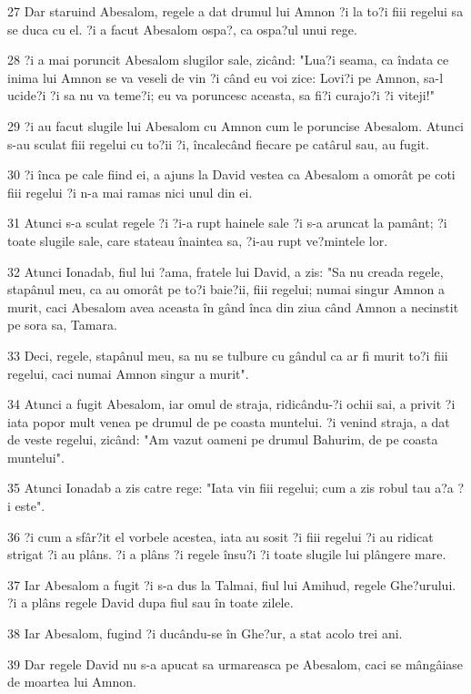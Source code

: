 \par 27 Dar staruind Abesalom, regele a dat drumul lui Amnon ?i la to?i fiii regelui sa se duca cu el. ?i a facut Abesalom ospa?, ca ospa?ul unui rege.
\par 28 ?i a mai poruncit Abesalom slugilor sale, zicând: "Lua?i seama, ca îndata ce inima lui Amnon se va veseli de vin ?i când eu voi zice: Lovi?i pe Amnon, sa-l ucide?i ?i sa nu va teme?i; eu va poruncesc aceasta, sa fi?i curajo?i ?i viteji!"
\par 29 ?i au facut slugile lui Abesalom cu Amnon cum le poruncise Abesalom. Atunci s-au sculat fiii regelui cu to?ii ?i, încalecând fiecare pe catârul sau, au fugit.
\par 30 ?i înca pe cale fiind ei, a ajuns la David vestea ca Abesalom a omorât pe coti fiii regelui ?i n-a mai ramas nici unul din ei.
\par 31 Atunci s-a sculat regele ?i ?i-a rupt hainele sale ?i s-a aruncat la pamânt; ?i toate slugile sale, care stateau înaintea sa, ?i-au rupt ve?mintele lor.
\par 32 Atunci Ionadab, fiul lui ?ama, fratele lui David, a zis: "Sa nu creada regele, stapânul meu, ca au omorât pe to?i baie?ii, fiii regelui; numai singur Amnon a murit, caci Abesalom avea aceasta în gând înca din ziua când Amnon a necinstit pe sora sa, Tamara.
\par 33 Deci, regele, stapânul meu, sa nu se tulbure cu gândul ca ar fi murit to?i fiii regelui, caci numai Amnon singur a murit".
\par 34 Atunci a fugit Abesalom, iar omul de straja, ridicându-?i ochii sai, a privit ?i iata popor mult venea pe drumul de pe coasta muntelui. ?i venind straja, a dat de veste regelui, zicând: "Am vazut oameni pe drumul Bahurim, de pe coasta muntelui".
\par 35 Atunci Ionadab a zis catre rege: "Iata vin fiii regelui; cum a zis robul tau a?a ?i este".
\par 36 ?i cum a sfâr?it el vorbele acestea, iata au sosit ?i fiii regelui ?i au ridicat strigat ?i au plâns. ?i a plâns ?i regele însu?i ?i toate slugile lui plângere mare.
\par 37 Iar Abesalom a fugit ?i s-a dus la Talmai, fiul lui Amihud, regele Ghe?urului. ?i a plâns regele David dupa fiul sau în toate zilele.
\par 38 Iar Abesalom, fugind ?i ducându-se în Ghe?ur, a stat acolo trei ani.
\par 39 Dar regele David nu s-a apucat sa urmareasca pe Abesalom, caci se mângâiase de moartea lui Amnon.

